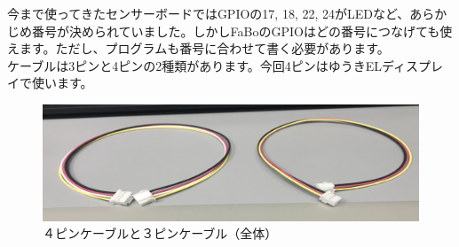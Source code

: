 今まで使ってきたセンサーボードではGPIOの17, 18, 22, 24がLEDなど、あらかじめ番号が決められていました。しかしFaBoのGPIOはどの番号につなげても使えます。ただし、プログラムも番号に合わせて書く必要があります。\\
ケーブルは3ピンと4ピンの2種類があります。今回4ピンはゆうきELディスプレイで使います。\\
\begin{figure}[h]
\begin{center}
    \includegraphics[scale=0.6]{images/chap05/text05-img013.png}
    \caption{４ピンケーブルと３ピンケーブル（全体）}
\end{center}
\end{figure}
